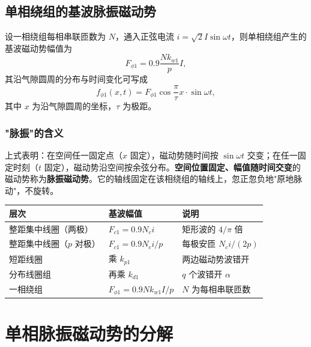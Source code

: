 \subsection{单相绕组的基波脉振磁动势}
设一相绕组每相串联匝数为 $N$，通入正弦电流 $i=\sqrt2I\sin\omega t$，则单相绕组产生的基波磁动势幅值为
\begin{equation}
F_{\phi1}=0.9\frac{Nk_{w1}}{p}I ,
\end{equation}
其沿气隙圆周的分布与时间变化可写成
\begin{equation}
f_{\phi1}(x,t)=F_{\phi1}\cos\frac{\pi}{\tau}x\cdot\sin\omega t ,
\end{equation}
其中 $x$ 为沿气隙圆周的坐标，$\tau$ 为极距。


\subsubsection{"脉振"的含义}
上式表明：在空间任一固定点（$x$ 固定），磁动势随时间按 $\sin\omega t$ 交变；在任一固定时刻（$t$ 固定），磁动势沿空间按余弦分布。\textbf{空间位置固定、幅值随时间交变}的磁动势称为\textbf{脉振磁动势}。它的轴线固定在该相绕组的轴线上，忽正忽负地"原地脉动"，不旋转。

\begin{center}
\begin{tabular}{@{}lll@{}}
\toprule
层次 & 基波幅值 & 说明 \\
\midrule
整距集中线圈（两极） & $F_{c1}=0.9N_ci$ & 矩形波的 $4/\pi$ 倍 \\
整距集中线圈（$p$ 对极） & $F_{c1}=0.9N_ci/p$ & 每极安匝 $N_ci/(2p)$ \\
短距线圈 & 乘 $k_{p1}$ & 两边磁动势波错开 \\
分布线圈组 & 再乘 $k_{d1}$ & $q$ 个波错开 $\alpha$ \\
一相绕组 & $F_{\phi1}=0.9Nk_{w1}I/p$ & $N$ 为每相串联匝数 \\
\bottomrule
\end{tabular}
\end{center}


\section{单相脉振磁动势的分解}


